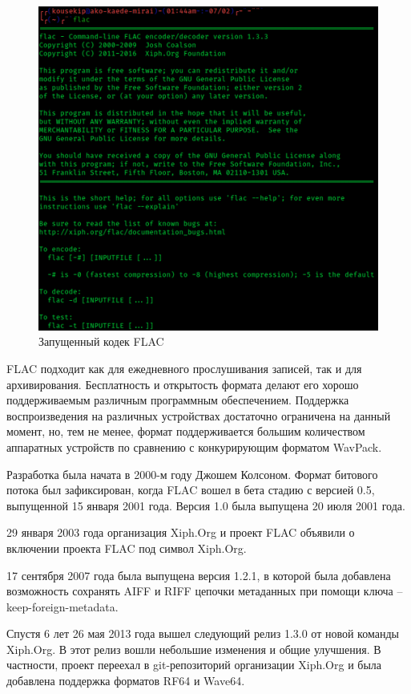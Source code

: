 \documentclass[12pt,a4paper,oneside]{report}
\begin{document}
\begin{figure}[!htbp]
	\centering
	\includegraphics[scale=0.6]{flaccodec.png}
	\caption{Запущенный кодек FLAC}
	\label{ris:flaccodec}
\end{figure}

FLAC подходит как для ежедневного прослушивания записей, так и для архивирования. Бесплатность и открытость формата делают его хорошо поддерживаемым различным программным обеспечением. Поддержка воспроизведения на различных устройствах достаточно ограничена на данный момент, но, тем не менее, формат поддерживается большим количеством аппаратных устройств по сравнению с конкурирующим форматом WavPack.

Разработка была начата в 2000-м году Джошем Колсоном. Формат битового потока был зафиксирован, когда FLAC вошел в бета стадию с версией 0.5, выпущенной 15 января 2001 года. Версия 1.0 была выпущена 20 июля 2001 года.

29 января 2003 года организация Xiph.Org и проект FLAC объявили о включении проекта FLAC под символ Xiph.Org.

17 сентября 2007 года была выпущена версия 1.2.1, в которой была добавлена возможность сохранять AIFF и RIFF цепочки метаданных при помощи ключа --keep-foreign-metadata.

Спустя 6 лет 26 мая 2013 года вышел следующий релиз 1.3.0 от новой команды Xiph.Org. В этот релиз вошли небольшие изменения и общие улучшения. В частности, проект переехал в git-репозиторий организации Xiph.Org и была добавлена поддержка форматов RF64 и Wave64.
\end{document}
